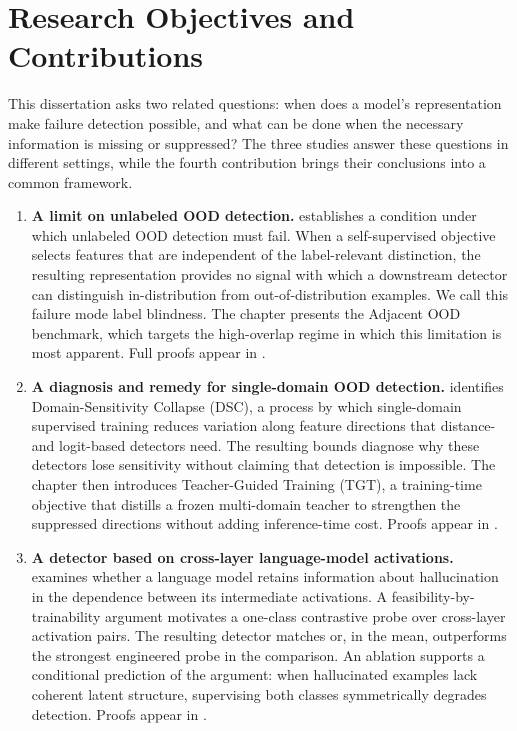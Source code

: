 \section{Research Objectives and Contributions}
\label{sec:intro:contributions}

This dissertation asks two related questions: when does a model's representation
make failure detection possible, and what can be done when the necessary
information is missing or suppressed? The three studies answer these questions
in different settings, while the fourth contribution brings their conclusions
into a common framework.

\begin{enumerate}
  \item \textbf{A limit on unlabeled OOD detection.}
   establishes a condition under which unlabeled OOD
  detection must fail. When a self-supervised objective selects features that
  are independent of the label-relevant distinction, the resulting
  representation provides no signal with which a downstream detector can
  distinguish in-distribution from out-of-distribution examples. We
  call this failure mode label blindness. The chapter presents the
  Adjacent OOD benchmark, which targets the high-overlap regime in which this
  limitation is most apparent. Full proofs appear in .

  \item \textbf{A diagnosis and remedy for single-domain OOD detection.}
   identifies Domain-Sensitivity Collapse
  (DSC), a process by which single-domain supervised training reduces variation
  along feature directions that distance- and logit-based detectors need. The
  resulting bounds diagnose why these detectors lose sensitivity without
  claiming that detection is impossible. The chapter then introduces
  Teacher-Guided Training (TGT), a training-time objective that distills a
  frozen multi-domain teacher to strengthen the suppressed directions without
  adding inference-time cost. Proofs appear in .

  \item \textbf{A detector based on cross-layer language-model activations.}
   examines whether a language model retains
  information about hallucination in the dependence between its intermediate
  activations. A feasibility-by-trainability argument motivates a one-class
  contrastive probe over cross-layer activation pairs. The resulting detector
  matches or, in the mean, outperforms the strongest engineered probe in the
  comparison. An ablation supports a conditional prediction of the argument: when
  hallucinated examples lack coherent latent structure, supervising both classes
  symmetrically degrades detection. Proofs appear in
  .


\end{enumerate}
